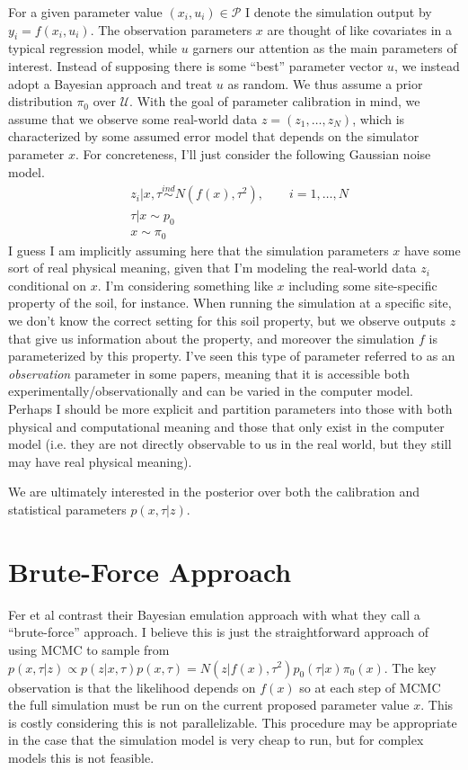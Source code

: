 \documentclass[12pt]{article}
\begin{document}
For a given parameter value $(x_i, u_i) \in \mathcal{P}$ I denote the simulation output by $y_i = f(x_i, u_i)$.
The observation parameters $x$ are thought of like covariates in a typical regression model, while $u$ garners our attention as the main parameters of interest. Instead of supposing 
there is some ``best'' parameter vector $u$, we instead adopt a Bayesian approach and treat $u$ as random. 
 We thus assume a prior distribution $\pi_0$ over $\mathcal{U}$. 
With the goal of parameter calibration in mind, we assume that we observe some real-world data $z = (z_1, \dots, z_N)$, which is characterized by some assumed error model that depends on the simulator parameter
$x$. For concreteness, I'll just consider the following Gaussian noise model. 
\begin{align*}
&z_i|x, \tau \overset{ind}{\sim} N(f(x), \tau^2), \qquad i = 1, \dots, N \\
&\tau|x \sim p_0 \\
&x \sim \pi_0
\end{align*}
I guess I am implicitly assuming here that the simulation parameters $x$ have some sort of real physical meaning, given that I'm modeling the real-world data $z_i$ conditional on $x$. 
I'm considering something like $x$ including some site-specific property of the soil, for instance. When running the simulation at a specific site, we don't know the correct setting for this soil 
property, but we observe outputs $z$ that give us information about the property, and moreover the simulation $f$ is parameterized by this property. I've seen this type of parameter referred to
as an \textit{observation} parameter in some papers, meaning that it is accessible both experimentally/observationally and can be varied in the computer model. Perhaps I should be more explicit 
and partition parameters into those with both physical and computational meaning and those that only exist in the computer model (i.e. they are not directly observable to us in the real world, but they still may have real physical meaning). 

We are ultimately interested in the 
posterior over both the calibration and statistical parameters $p(x, \tau|z)$. 

\section{Brute-Force Approach}
Fer et al contrast their Bayesian emulation approach with what they call a ``brute-force'' approach. I believe this is just the straightforward approach of using MCMC to sample from 
$p(x, \tau|z) \propto p(z|x, \tau)p(x, \tau) = N(z|f(x), \tau^2)p_0(\tau|x)\pi_0(x)$. 
The key observation is that the likelihood depends on $f(x)$ so at each step of MCMC the full simulation must be run on the current proposed parameter value $x$. This is costly considering this is not parallelizable. This procedure may be appropriate in the case that the simulation model is very cheap to run, but for complex models this is not 
feasible. 
\end{document}
